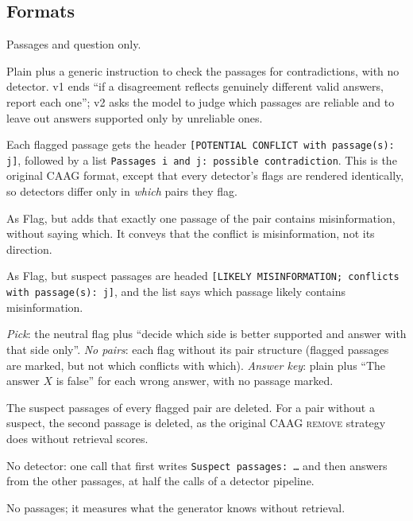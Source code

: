 \subsection{Formats}
\label{sec:formats}
\begin{description}[leftmargin=0pt,itemsep=1pt,topsep=2pt]
\item[No flags (plain).] Passages and question only.
\item[Instruction.] Plain plus a generic instruction to check the passages for contradictions, with no detector.
v1 ends ``if a disagreement reflects genuinely different valid answers, report each one''; v2 asks the model to
judge which passages are reliable and to leave out answers supported only by unreliable ones.
\item[Flag (neutral).] Each flagged passage gets the header \texttt{[POTENTIAL CONFLICT with passage(s): j]}, followed by a list
\texttt{Passages i and j: possible contradiction}. This is the original CAAG format, except that every detector's
flags are rendered identically, so detectors differ only in \emph{which} pairs they flag.
\item[One-wrong flag.] As Flag, but adds that exactly one passage of the pair contains misinformation, without saying
which. It conveys that the conflict is misinformation, not its direction.
\item[Directional flag.] As Flag, but suspect passages are headed \texttt{[LIKELY MISINFORMATION; conflicts with
passage(s): j]}, and the list says which passage likely contains misinformation.
\item[Controls.] \emph{Pick}: the neutral flag plus ``decide which side is better supported and answer with that
side only''. \emph{No pairs}: each flag without its pair structure (flagged passages are marked, but not which conflicts
with which). \emph{Answer key}: plain plus ``The answer $X$ is false'' for each wrong answer, with no passage marked.
\item[Remove (suspect).] The suspect passages of every flagged pair are deleted. For a pair without a suspect, the
second passage is deleted, as the original CAAG \textsc{remove} strategy does without retrieval scores.
\item[Single call.] No detector: one call that first writes \texttt{Suspect passages: \dots} and then answers from
the other passages, at half the calls of a detector pipeline.
\item[Closed book.] No passages; it measures what the generator knows without retrieval.
\end{description}

